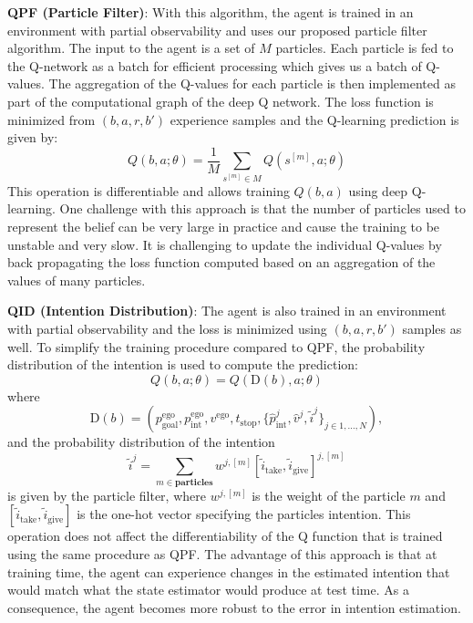	\textbf{QPF (Particle Filter)}: With this algorithm, the agent is trained in an environment with partial observability and uses our proposed particle filter algorithm. 
	The input to the agent is a set of $M$ particles. Each particle is fed to the Q-network as a batch for efficient processing which gives us a batch of Q-values.
	The aggregation of the Q-values for each particle is then implemented as part of the computational graph of the deep Q network. 
	The loss function is minimized from $(b, a, r, b')$ experience samples and the Q-learning prediction is given by:
	\begin{equation}
		Q(b, a; \theta) = \frac{1}{M} \sum_{s^{[m]} \in M} Q(s^{[m]}, a; \theta)
	\end{equation}
	This operation is differentiable and allows training $Q(b, a)$ using deep Q-learning. 
	One challenge with this approach is that the number of particles used to represent the belief can be very large in practice and cause the training to be unstable and very slow. It is challenging to update the individual Q-values by back propagating the loss function computed based on an aggregation of the values of many particles.
	
	\textbf{QID (Intention Distribution)}: The agent is also trained in an environment with partial observability and the loss is minimized using $(b, a, r, b')$ samples as well. To simplify the training procedure compared to QPF, the probability distribution of the intention is used to compute the prediction:
	\begin{equation}
		Q(b, a; \theta) = Q(\text{D}(b), a; \theta)
	\end{equation}
	where 
	\begin{equation}
		\text{D}(b) = (p^\mathrm{ego}_\mathrm{goal},p^\mathrm{ego}_\mathrm{int}, v^\mathrm{ego}, t_\mathrm{stop}, \{\hat{p}^{j}_\mathrm{int}, \hat{v}^j, \tilde{i}^j\}_{j\in1,\dots,N}),
		\label{eq:IE_b}
	\end{equation}
	and the probability distribution of the intention
	\begin{equation}
		\tilde{i}^j = \sum_{m \in \textbf{particles}} w^{j,[m]} [\tilde{i}_\text{take} , \tilde{i}_\text{give}]^{j,[m]}
	\end{equation}
	is given by the particle filter, where $w^{j,[m]}$ is the weight of the particle $m$ and $[\tilde{i}_\text{take} , \tilde{i}_\text{give}]$ is the one-hot vector specifying the particles intention. 
	This operation does not affect the differentiability of the Q function that is trained using the same procedure as QPF. 
	The advantage of this approach is that at training time, the agent can experience changes in the estimated intention that would match what the state estimator would produce at test time.
	As a consequence, the agent becomes more robust to the error in intention estimation.
	
